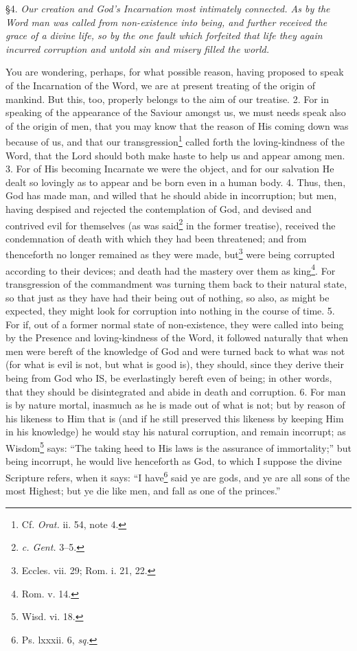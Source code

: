 
§4. \emph{Our creation and God’s Incarnation most intimately connected. As by the Word man was called from non-existence into being, and further received the grace of a divine life, so by the one fault which forfeited that life they again incurred corruption and untold sin and misery filled the world.}

You are wondering, perhaps, for what possible reason, having proposed to speak of the Incarnation of the Word, we are at present treating of the origin of mankind. But this, too, properly belongs to the aim of our treatise. 2. For in speaking of the appearance of the Saviour amongst us, we must needs speak also of the origin of men, that you may know that the reason of His coming down was because of us, and that our transgression\footnote{Cf. \emph{Orat.} ii. 54, note 4.} called forth the loving-kindness of the Word, that the Lord should both make haste to help us and appear among men. 3. For of His becoming Incarnate we were the object, and for our salvation He dealt so lovingly as to appear and be born even in a human body. 4. Thus, then, God has made man, and willed that he should abide in incorruption; but men, having despised and rejected the contemplation of God, and devised and contrived evil for themselves (as was said\footnote{\emph{c. Gent.} 3–5.} in the former treatise), received the condemnation of death with which they had been threatened; and from thenceforth no longer remained as they were made, but\footnote{Eccles. vii. 29; Rom. i. 21, 22.} were being corrupted according to their devices; and death had the mastery over them as king\footnote{Rom. v. 14.}. For transgression of the commandment was turning them back to their natural state, so that just as they have had their being out of nothing, so also, as might be expected, they might look for corruption into nothing in the course of time. 5. For if, out of a former normal state of non-existence, they were called into being by the Presence and loving-kindness of the Word, it followed naturally that when men were bereft of the knowledge of God and were turned back to what was not (for what is evil is not, but what is good is), they should, since they derive their being from God who IS, be everlastingly bereft even of being; in other words, that they should be disintegrated and abide in death and corruption. 6. For man is by nature mortal, inasmuch as he is made out of what is not; but by reason of his likeness to Him that is (and if he still preserved this likeness by keeping Him in his knowledge) he would stay his natural corruption, and remain incorrupt; as Wisdom\footnote{Wisd. vi. 18.} says: “The taking heed to His laws is the assurance of immortality;” but being incorrupt, he would live henceforth as God, to which I suppose the divine Scripture refers, when it says: “I have\footnote{Ps. lxxxii. 6, \emph{sq.}} said ye are gods, and ye are all sons of the most Highest; but ye die like men, and fall as one of the princes.”

